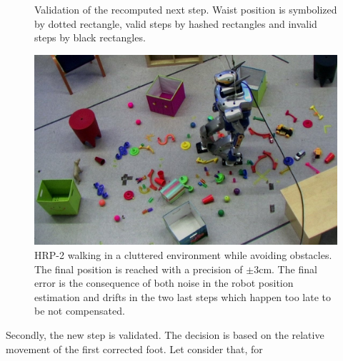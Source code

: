 \begin{figure}[ht!]
\begin{center}
  \end{center}
  \caption{Validation of the recomputed next step. Waist position is
    symbolized by dotted rectangle, valid steps by hashed rectangles
    and invalid steps by black rectangles.
    \label{fig:stepvalid}}
\end{figure}
%
%
\begin{figure}
  \begin{center}
    \includegraphics[width=\textwidth]{src/chap2-suivi-trajectoire/demo.jpg}
  \end{center}
  \caption{HRP-2 walking in a cluttered environment while avoiding
    obstacles. The final position is reached with a precision of $\pm
    3\mathrm{cm}$. The final error is the consequence of both noise in
    the robot position estimation and drifts in the two last steps
    which happen too late to be not compensated. \label{fig:scenario}}
\end{figure}
%
%
%
Secondly, the new step is validated. The decision is based on the
relative movement of the first corrected foot. Let consider that, for
